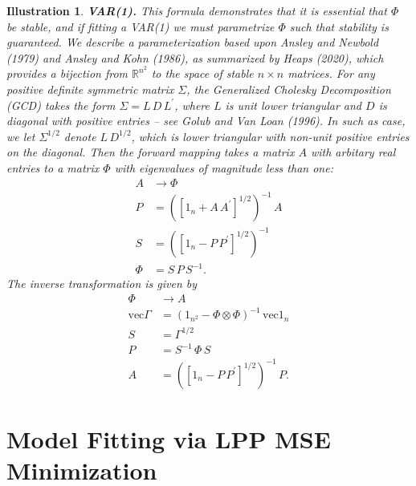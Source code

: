 \documentclass[a4paper]{book}
\def\RR{\mathbb R}
\def\tends{\rightarrow}
\newtheorem{Illustration}{Illustration}
\begin{document}
\begin{Illustration} {\bf  VAR(1).}
 This formula demonstrates that it is 
 essential that $\Phi$ be stable, and if fitting a VAR(1) we must parametrize $\Phi$
 such that stability is guaranteed.  We describe a parameterization based upon
 Ansley and Newbold (1979) and Ansley and Kohn (1986), as summarized by Heaps (2020),
  which  provides a bijection from $\RR^{n^2} $
 to the space of stable $n \times n $ matrices.
 For any positive definite symmetric matrix $\Sigma$, the Generalized Cholesky Decomposition
  (GCD) takes the form $\Sigma = L \, D \, L^{\prime}$, where
    $L$ is  unit lower triangular and $D$ is diagonal with positive entries --
    see Golub and Van Loan (1996).
    In such as case, we let $\Sigma^{1/2}$ denote $L \, D^{1/2}$, which is lower triangular
    with non-unit positive entries on the diagonal.
  Then the forward mapping takes a matrix $A$ with arbitary real entries to
  a matrix $\Phi$ with eigenvalues of magnitude less than one:
\begin{align*}
  A & \tends \Phi \\
  P & = { \left( { \left[  1_n + A \, A^{\prime} \right] }^{1/2} \right)}^{-1} \, A \\
  S & = { \left( { \left[ 1_n - P \, P^{\prime} \right] }^{1/2} \right) }^{-1} \\
  \Phi & = S \, P \, S^{-1}.
\end{align*}
    The inverse transformation is  given by
\begin{align*}
   \Phi & \tends A \\
  \mbox{vec} \Gamma & = { \left( 1_{n^2} - \Phi \otimes \Phi \right) }^{-1} \, 
  \mbox{vec} 1_n \\
  S & = \Gamma^{1/2} \\
  P & = S^{-1} \, \Phi \, S \\
  A & = { \left( { \left[ 1_n - P \, P^{\prime} \right] }^{1/2} \right) }^{-1} \, P.
\end{align*}
\end{Illustration}




\section{Model Fitting via LPP MSE Minimization}
\end{document}
